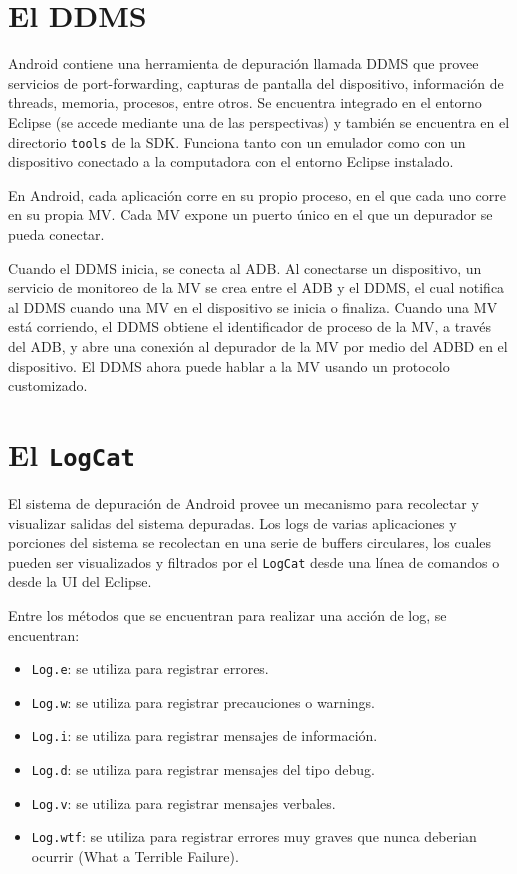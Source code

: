 \section{El \ac{DDMS}}
\label{sec:ddms}

Android contiene una herramienta de depuraci\'on llamada \ac{DDMS} que provee servicios de port-forwarding, capturas de pantalla del dispositivo, informaci\'on de threads, memoria, procesos, entre otros. Se encuentra integrado en el entorno Eclipse (se accede mediante una de las perspectivas) y tambi\'en se encuentra en el directorio \texttt{tools} de la \ac{SDK}. Funciona tanto con un emulador como con un dispositivo conectado a la computadora con el entorno Eclipse instalado.

En Android, cada aplicaci\'on corre en su propio proceso, en el que cada uno corre en su propia \ac{MV}. Cada \ac{MV} expone un puerto \'unico en el que un depurador se pueda conectar.

Cuando el \ac{DDMS} inicia, se conecta al \ac{ADB}. Al conectarse un dispositivo, un servicio de monitoreo de la \ac{MV} se crea entre el \ac{ADB} y el \ac{DDMS}, el cual notifica al \ac{DDMS} cuando una \ac{MV} en el dispositivo se inicia o finaliza. Cuando una \ac{MV} est\'a corriendo, el \ac{DDMS} obtiene el identificador de proceso de la \ac{MV}, a trav\'es del \ac{ADB}, y abre una conexi\'on al depurador de la \ac{MV} por medio del \ac{ADBD} en el dispositivo. El \ac{DDMS} ahora puede hablar a la \ac{MV} usando un protocolo customizado.

\section{El \texttt{LogCat}}
\label{sec:logcat}

El sistema de depuraci\'on de Android provee un mecanismo para recolectar y visualizar salidas del sistema depuradas. Los logs de varias aplicaciones y porciones del sistema se recolectan en una serie de buffers circulares, los cuales pueden ser visualizados y filtrados por el \texttt{LogCat} desde una l\'inea de comandos o desde la \ac{UI} del Eclipse.

Entre los m\'etodos que se encuentran para realizar una acci\'on de log, se encuentran:

\begin{itemize}
\item \texttt{Log.e}: se utiliza para registrar errores.
\item \texttt{Log.w}: se utiliza para registrar precauciones o warnings.
\item \texttt{Log.i}: se utiliza para registrar mensajes de informaci\'on.
\item \texttt{Log.d}: se utiliza para registrar mensajes del tipo debug.
\item \texttt{Log.v}: se utiliza para registrar mensajes verbales.
\item \texttt{Log.wtf}: se utiliza para registrar errores muy graves que nunca deberian ocurrir (What a Terrible Failure).
\end{itemize}

